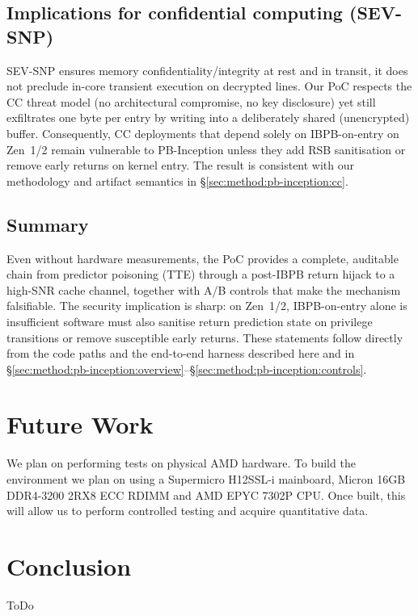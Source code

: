 \documentclass[11pt,a4paper]{article}
\begin{document}
\subsection{Implications for confidential computing (SEV-SNP)}
SEV-SNP ensures memory confidentiality/integrity at rest and in transit, it does not preclude in-core transient execution on decrypted lines. Our PoC respects the CC threat model (no architectural compromise, no key disclosure) yet still exfiltrates one byte per entry by writing into a deliberately shared (unencrypted) buffer. Consequently, CC deployments that depend solely on IBPB-on-entry on Zen~1/2 remain vulnerable to PB-Inception unless they add RSB sanitisation or remove early returns on kernel entry. The result is consistent with our methodology and artifact semantics in \S\ref{sec:method:pb-inception:cc}.\cite{wikner2025breaking,linux_srso_doc}

\subsection{Summary}
Even without hardware measurements, the PoC provides a complete, auditable chain from predictor poisoning (TTE) through a post-IBPB return hijack to a high-SNR cache channel, together with A/B controls that make the mechanism falsifiable. The security implication is sharp: on Zen~1/2, IBPB-on-entry alone is insufficient software must also sanitise return prediction state on privilege transitions or remove susceptible early returns. These statements follow directly from the code paths and the end-to-end harness described here and in \S\ref{sec:method:pb-inception:overview}--\S\ref{sec:method:pb-inception:controls}.\cite{wikner2025breaking,trujillo2023inception,linux_srso_doc,linux_rsb_doc}

\section{Future Work}
We plan on performing tests on physical AMD hardware. To build the environment we plan on using a Supermicro H12SSL-i mainboard, Micron 16GB DDR4-3200 2RX8 ECC RDIMM and AMD EPYC 7302P CPU. Once built, this will allow us to perform controlled testing and acquire quantitative data.

\section{Conclusion}
ToDo
\end{document}
